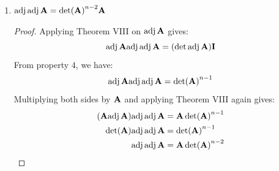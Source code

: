\documentclass{article}
\begin{document}
\begin{enumerate}
\begin{proof}
            If $\rank \bff{A} \le n-2$, then $\rank \adj \bff{A} = 0.$ This means that the minimum amount of rows that we need to remove such that all rows are linearly independent is $2$. All minors will have $n-1$ rows, so all minors are consisted of linearly dependent rows and as a result, the determinant of the minors will all be zero and thus $\adj \bff{A} = \bff{0}$. 
        \end{proof}
        \item $\mathrm{adj}\,\mathrm{adj}\,\mathbf{A} = \det(\mathbf{A})^{n-2}\mathbf{A}$
        \begin{proof}
            Applying Theorem VIII on $\mathrm{adj}\,\mathbf{A}$ gives:
            \begin{equation*}
                \mathrm{adj}\,\mathbf{A} \mathrm{adj}\,\mathrm{adj}\,\mathbf{A} = (\det \mathrm{adj}\,\mathbf{A})\mathbf{I}
            \end{equation*}
            From property $4$, we have:
            \begin{equation*}
                \mathrm{adj}\,\mathbf{A}\mathrm{adj}\,\mathrm{adj}\,\mathbf{A} = \det(\mathbf{A})^{n-1}
            \end{equation*}
            Multiplying both sides by $\mathbf{A}$ and applying Theorem VIII again gives:
            \begin{align*}
                (\mathbf{A} \mathrm{adj}\,\mathbf{A})\mathrm{adj}\,\mathrm{adj}\,\mathbf{A} &= \mathbf{A}\det(\mathbf{A})^{n-1} \\ 
                \det(\mathbf{A})\mathrm{adj}\,\mathrm{adj}\,\mathbf{A} &= \det(\mathbf{A})^{n-1} \\
                \mathrm{adj}\,\mathrm{adj}\,\mathbf{A} &= \mathbf{A}\det(\mathbf{A})^{n-2} 
            \end{align*}
        \end{proof}
    \end{enumerate}
\end{document}

